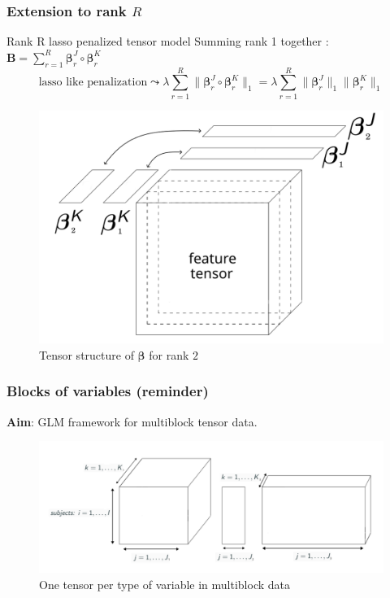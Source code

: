 \documentclass{beamer}
\begin{document}
\begin{frame}
    \frametitle{Extension to rank $R$ \cite{multi_rank_r}}
    \begin{block}{Rank R lasso penalized tensor model}
    \hspace{50 pt}Summing rank 1 together : $\mathbf{B} = \sum\limits_{r = 1}^R \bm{\beta}_{r}^J \circ \bm{\beta}_{r}^K$\\[-10 pt]
    $$ \text{lasso like penalization} \leadsto \lambda \sum\limits_{r = 1}^R  \lVert \bm{\beta}_r^J \circ \bm{\beta}_r^K \rVert_1  =  \lambda \sum\limits_{r = 1}^R\lVert \bm{\beta}_r^J \rVert_1 \lVert \bm{\beta}_r^K \rVert_1 $$
    \end{block}
    \vspace{-10 pt}
\begin{figure}
        \centering
        \includegraphics[scale=0.19]{images/beta_tens_R.png}
        \caption{Tensor structure of $\bm{\beta}$ for rank $2$}

\end{figure}

\end{frame}

\begin{frame}
 \frametitle{Blocks of variables (reminder)}
 \textbf{Aim}: GLM framework for multiblock tensor data.\\[10 pt]

 \begin{figure}
    \centering
    \includegraphics[scale = 0.33]{images/blocks_faux.png}
    \caption{One tensor per type of variable in multiblock data}
\end{figure}

\end{frame}
\end{document}
